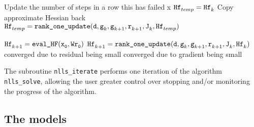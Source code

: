 \begin{algorithm}
  \ContinuedFloat
  \begin{algorithmic}
    
          \Comment Update the number of steps in a row this has failed
            x
            \State ${\iter[temp]{\thess}} = {\iter[k]{\thess}}$
            \Comment Copy approximate Hessian back
          \EndIf
          \EndIf
        \EndIf
      \State ${\iter[temp]{\thess}} = \Call{{\tt rank\_one\_update}}{\td ,\iter[k]{\tg},\iter[k+1]{\tg}, \iter[k+1]{\tr},\iter[k]{\tJ},\iter[temp]{\thess}}$
      \EndIf
    \EndIf

        \State $\iter[k+1]{\thess} = {\tt \text{\tt eval\_HF}(\iter[0]{\tx},W\iter[0]{\tr})}$
      \Else
        \State ${\iter[k+1]{\thess}} = \Call{{\tt rank\_one\_update}}{\td ,\iter[k]{\tg},\iter[k+1]{\tg}, \iter[k+1]{\tr},\iter[k]{\tJ},\iter[k]{\thess}}$
      \EndIf
    \EndIf
    \Comment converged due to residual being small
    \Comment converged due to gradient being small
    \EndIf
    \EndFor
  \end{algorithmic}
\end{algorithm}

The subroutine \texttt{nlls\_iterate} performs one iteration of the algorithm
\texttt{nlls\_solve}, allowing the user greater control over stopping and/or monitoring the progress of the algorithm.


\subsection{The models}
\label{sec:model_description}

